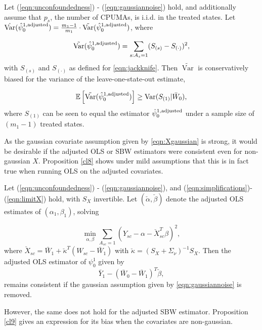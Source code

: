 \begin{proposition}\label{prop:jackknife}
Let (\ref{eqn:unconfoundedness}) - (\ref{eqn:gaussiannoise}) hold, and additionally assume that $p_s$, the number of CPUMAs, is i.i.d. in the treated states. Let $\hat{\operatorname{Var}}(\hat{\psi}_0^{1, \textup{adjusted}}) = \frac{m_1-1}{m_1} \cdot \tilde{\operatorname{Var}}(\hat{\psi}_0^{1, \textup{adjusted}})$, where

\begin{equation} \label{eqn:prop.jackknife}
\tilde{\operatorname{Var}}(\hat{\psi}_0^{1, \textup{adjusted}}) = \sum_{s:A_{s}=1} (S_{(s)} - S_{(\cdot)})^2,
\end{equation}
with $S_{(s)}$ and $S_{(\cdot)}$ as defined for \eqref{eqn:jackknife}. Then $\tilde{\operatorname{Var}}$ is conservatively biased for the variance of the leave-one-state-out estimate,

\[ \mathbb{E}\left[ \tilde{\operatorname{Var}}(\hat{\psi}_0^{1, \textup{adjusted}})\right] \geq \operatorname{Var}(S_{(1)} | \bar{W}_0),\]
where $S_{(1)}$ can be seen to equal the estimator $\hat{\psi}_0^{1,\textup{adjusted}}$ under a sample size of $(m_1-1)$ treated states.

\end{proposition}

As the gaussian covariate assumption given by \eqref{eqn:Xgaussian} is strong, it would be desirable if the adjusted OLS or SBW estimators were consistent even for non-gaussian $X$. Proposition \ref{cl8} shows under mild assumptions that this is in fact true when running OLS on the adjusted covariates. 

\begin{proposition}\label{cl8}
Let (\ref{eqn:unconfoundedness}) - (\ref{eqn:gaussiannoise}), and (\ref{eqn:simplifications})- (\ref{eqn:limitX}) hold, with $S_X$ invertible. Let $(\check{\alpha}, \check{\beta})$ denote the adjusted OLS estimates of $(\alpha_1, \beta_1)$, solving

\[ \min_{\alpha,\beta} \sum_{A_{sc}=1} (Y_{sc} - \alpha - \check{X}_{sc}^T \beta)^2, \]
where $\check{X}_{sc} = \bar{W}_1 + \check{\kappa}^T(W_{sc} - \bar{W}_1)$ with $\check{\kappa} = (S_X + \Sigma_\nu)^{-1}S_X$. Then the adjusted OLS estimator of $\psi_0^1$ given by
\[ \bar{Y}_1 - (\bar{W}_0 - \bar{W}_1)^T \check{\beta},\]
remains consistent if the gaussian assumption given by \eqref{eqn:gaussiannoise} is removed.
\end{proposition}

However, the same does not hold for the adjusted SBW estimator. Proposition \ref{cl9} gives an expression for its bias when the covariates are non-gaussian. 

